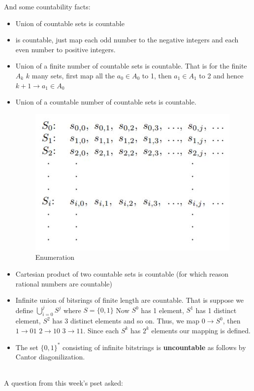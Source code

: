 \documentclass[titlepage]{article}
\theoremstyle{definition}
\numberwithin{equation}{subsection}
\numberwithin{remark}{subsection}
\begin{document}
And some countability facts:
\begin{itemize}
    \item Union of countable sets is countable
    \item {} is countable, just map each odd number to the negative integers and each even number to positive integers. 
    \item Union of a finite number of countable sets is countable. That is for the finite $A_{k}$ $k$ many sets, first map all the $a_{0} \in A_{0}$ to 1, then $a_{1} \in A_{1}$ to 2 and hence $k+1 \to a_{1} \in A_{0} $
    \item Union of a countable number of countable sets is countable.
    \begin{figure}[H]
        \centering
        \includegraphics[scale = .6]{epflLectureNotes/advancedComputation/figures/walk.JPG}
        \caption{Enumeration}
        \label{fig:my_label}
    \end{figure}
    \item Cartesian product of two countable sets is countable (for which reason rational numbers are countable)
    \item Infinite union of bitsrings of finite length are countable. That is suppose we define $\bigcup_{i=0}^{j} S^{j}$ where $S = \{0,1\}$ Now $S^{0}$ has 1 element, $S^{1}$ has 1 distinct element, $S^{2}$ has 3 distinct elements and so on. Thus, we map $ 0 \to S^{0}$, then $1 \to 01 $ $2 \to 10$ $3 \to 11$. Since each $S^{k}$ has $2^{k}$ elements our mapping is defined. 
    \item The set $\{0,1\}^{*}$ consisting of infinite bitstrings is \textbf{uncountable} as follows by Cantor diagonilization. 
\end{itemize}
\\
A question from this week's pset asked:
\\
\end{document}
